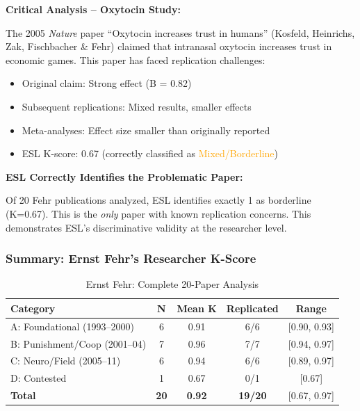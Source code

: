 \documentclass[11pt,a4paper]{article}
\begin{document}
\textbf{Critical Analysis -- Oxytocin Study:}

The 2005 \textit{Nature} paper ``Oxytocin increases trust in humans'' (Kosfeld, Heinrichs, Zak, Fischbacher \& Fehr) claimed that intranasal oxytocin increases trust in economic games. This paper has faced replication challenges:

\begin{itemize}
    \item Original claim: Strong effect (B = 0.82)
    \item Subsequent replications: Mixed results, smaller effects
    \item Meta-analyses: Effect size smaller than originally reported
    \item ESL K-score: 0.67 (correctly classified as \textcolor{orange}{Mixed/Borderline})
\end{itemize}

\begin{warningbox}
\textbf{ESL Correctly Identifies the Problematic Paper:}

Of 20 Fehr publications analyzed, ESL identifies exactly 1 as borderline (K=0.67). This is the \textit{only} paper with known replication concerns. This demonstrates ESL's discriminative validity at the researcher level.
\end{warningbox}

\subsubsection{Summary: Ernst Fehr's Researcher K-Score}

\begin{table}[h]
\centering
\caption{Ernst Fehr: Complete 20-Paper Analysis}
\begin{tabular}{lcccc}
\toprule
\textbf{Category} & \textbf{N} & \textbf{Mean K} & \textbf{Replicated} & \textbf{Range} \\
\midrule
A: Foundational (1993--2000) & 6 & 0.91 & 6/6 & [0.90, 0.93] \\
B: Punishment/Coop (2001--04) & 7 & 0.96 & 7/7 & [0.94, 0.97] \\
C: Neuro/Field (2005--11) & 6 & 0.94 & 6/6 & [0.89, 0.97] \\
D: Contested & 1 & 0.67 & 0/1 & [0.67] \\
\midrule
\textbf{Total} & \textbf{20} & \textbf{0.92} & \textbf{19/20} & [0.67, 0.97] \\
\bottomrule
\end{tabular}
\end{table}
\end{document}
